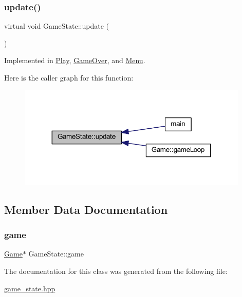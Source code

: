 \subsubsection{\texorpdfstring{update()}{update()}}
{\footnotesize\ttfamily virtual void Game\+State\+::update (\begin{DoxyParamCaption}{ }\end{DoxyParamCaption})\hspace{0.3cm}{\ttfamily [pure virtual]}}



Implemented in \hyperlink{class_play_a8eaa457d009e35bfbf699b38b569e3b8}{Play}, \hyperlink{class_game_over_a69f9e1364ff7caa8b17184441474c8b7}{Game\+Over}, and \hyperlink{class_menu_a8446e8a1e56e9cf1db93790067510a61}{Menu}.

Here is the caller graph for this function\+:
\nopagebreak
\begin{figure}[H]
\begin{center}
\leavevmode
\includegraphics[width=311pt]{class_game_state_ab2864bfa04f92f6966861a1f2883bda0_icgraph}
\end{center}
\end{figure}


\subsection{Member Data Documentation}
\mbox{\label{class_game_state_a355a79415b9ef63c2aec1448a99f6e71}} 
\subsubsection{\texorpdfstring{game}{game}}
{\footnotesize\ttfamily \hyperlink{class_game}{Game}$\ast$ Game\+State\+::game}



The documentation for this class was generated from the following file\+:\begin{DoxyCompactItemize}
\item 
\hyperlink{game__state_8hpp}{game\+\_\+state.\+hpp}\end{DoxyCompactItemize}

